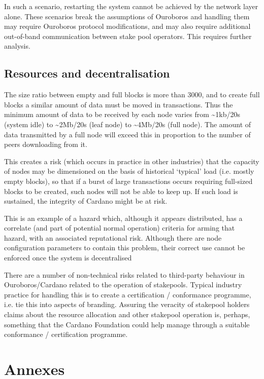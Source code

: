 \documentclass[11pt,a4paper]{article}
\begin{document}
In such a scenario, restarting the system cannot be achieved by the
network layer alone. These scenarios break the assumptions of Ouroboros
and handling them may require Ouroboros protocol modifications, and may
also require additional out-of-band communication between stake pool
operators. This requires further analysis.

\subsection{Resources and decentralisation}
\label{resources-and-decentralisation}

The size ratio between empty and full blocks is more than 3000, and to
create full blocks a similar amount of data must be moved in
transactions. Thus the minimum amount of data to be received by each
node varies from \textasciitilde{}1kb/20s (system idle) to
\textasciitilde{}2Mb/20s (leaf node) to \textasciitilde{}4Mb/20s (full
node). The amount of data transmitted by a full node will exceed this in
proportion to the number of peers downloading from it.

This creates a risk (which occurs in practice in other industries) that
the capacity of nodes may be dimensioned on the basis of historical
`typical' load (i.e. mostly empty blocks), so that if a burst of large
transactions occurs requiring full-sized blocks to be created, such
nodes will not be able to keep up. If such load is sustained, the
integrity of Cardano might be at risk.

This is an example of a hazard which, although it appears distributed,
has a correlate (and part of potential normal operation) criteria for
arming that hazard, with an associated reputational risk. Although there
are node configuration parameters to contain this problem, their correct
use cannot be enforced once the system is decentralised

There are a number of non-technical risks related to third-party
behaviour in Ouroboros/Cardano related to the operation of stakepools.
Typical industry practice for handling this is to create a certification
/ conformance programme, i.e. tie this into aspects of branding.
Assuring the veracity of stakepool holders claims about the resource
allocation and other stakepool operation is, perhaps, something that the
Cardano Foundation could help manage through a suitable conformance /
certification programme.

\section{Annexes}
\label{annexes}
\end{document}
